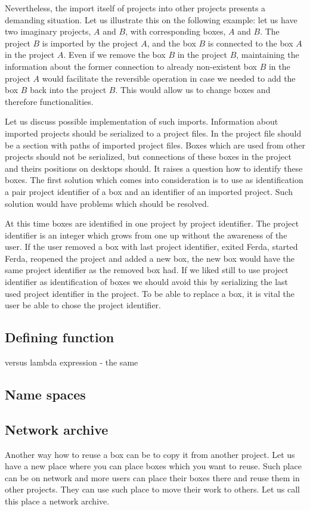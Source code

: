 \documentclass[a4paper,12pt]{book}
\begin{document}
Nevertheless, the import itself of projects into other projects presents a demanding situation. Let us illustrate this on the following example: let us have two imaginary projects, $A$ and $B$, with corresponding boxes, $A$ and $B$. The project $B$ is imported by the project $A$, and the box $B$ is connected to the box $A$ in the project $A$. Even if we remove the box $B$ in the project $B$, maintaining the information about the former connection to already non-existent box $B$ in the project $A$ would facilitate the reversible operation in case we needed to add the box $B$ back into the project $B$. This would allow us to change boxes and therefore functionalities.

Let us discuss possible implementation of such imports. Information about imported projects should be serialized to a project files. In the project file should be a section with paths of imported project files. Boxes which are used from other projects should not be serialized, but connections of these boxes in the project and theirs positions on desktops should. It raises a question how to identify these boxes. The first solution which comes into consideration is to use as identification a pair project identifier of a box and an identifier of an imported project. Such solution would have problems which should be resolved.

At this time boxes are identified in one project by project identifier. The project identifier is an integer which grows from one up without the awareness of the user. If the user removed a box with last project identifier, exited Ferda, started Ferda, reopened the project and added a new box, the new box would have the same project identifier as the removed box had. If we liked still to use project identifier as identification of boxes we should avoid this by serializing the last used project identifier in the project. To be able to replace a box, it is vital the user be able to chose the project identifier.

\subsection{Defining function}
versus lambda expression - the same
\subsection{Name spaces}
\subsection{Network archive}
Another way how to reuse a box can be to copy it from another project. Let us have a new place where you can place boxes which you want to reuse. Such place can be on network and more users can place their boxes there and reuse them in other projects. They can use such place to move their work to others. Let us call this place a network archive.
\end{document}
